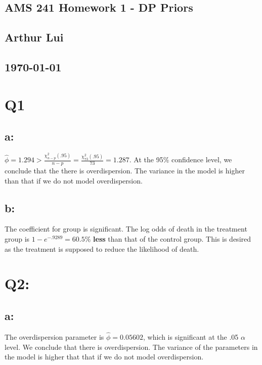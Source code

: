 \documentclass{article}
\begin{document}
\begin{center}
  \section*{\textbf{AMS 241 Homework 1 - DP Priors}
  } 
  \subsection*{\textbf{Arthur Lui}}
  \subsection*{\noindent\today}
\end{center}


\section*{Q1}
\subsection*{a:}
$\hat\phi = 1.294 > \frac{\chi^2_{n-p}(.95)}{n-p} =
\frac{\chi^2_{73}(.95)}{73} = 1.287$. At the 95\% confidence level, we
conclude that the there is overdispersion. The variance in the model is
higher than that if we do not model overdispersion.

\subsection*{b:}
The coefficient for group is significant. The log odds of death in the
treatment group is $1-e^{-.9289}=60.5\%$ \textbf{less} than that of the
control group. This is desired as the treatment is supposed to reduce the
likelihood of death.

\section*{Q2:}
\subsection*{a:}
The overdispersion parameter is $\hat\phi=0.05602$, which is significant at
the .05 $\alpha$ level. We conclude that there is overdispersion. The
variance of the parameters in the model is higher that that if we do not
model overdispersion.
\end{document}
